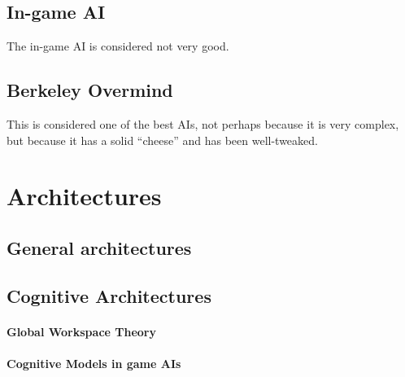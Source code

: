 \subsection{In-game AI}
The in-game AI is considered not very good.

\subsection{Berkeley Overmind}
This is considered one of the best AIs, not perhaps because it is very complex,
but because it has a solid ``cheese'' and has been well-tweaked.


\section{Architectures}
\subsection{General architectures}
\subsection{Cognitive Architectures}
\paragraph{Global Workspace Theory}
\paragraph{Cognitive Models in game AIs}
